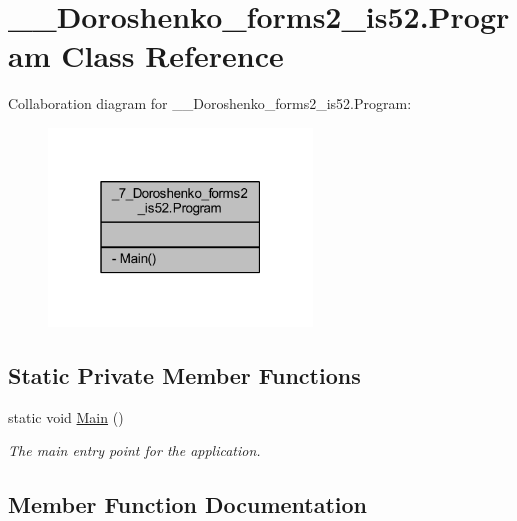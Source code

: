 \hypertarget{class__7___doroshenko__forms2__is52_1_1_program}{}\section{\+\_\+\_\+\+Doroshenko\+\_\+forms2\+\_\+is52.\+Program Class Reference}
\label{class__7___doroshenko__forms2__is52_1_1_program}


Collaboration diagram for \+\_\+\_\+\+Doroshenko\+\_\+forms2\+\_\+is52.\+Program\+:
\nopagebreak
\begin{figure}[H]
\begin{center}
\leavevmode
\includegraphics[width=199pt]{class__7___doroshenko__forms2__is52_1_1_program__coll__graph}
\end{center}
\end{figure}
\subsection*{Static Private Member Functions}
\begin{DoxyCompactItemize}
\item 
static void \hyperlink{class__7___doroshenko__forms2__is52_1_1_program_ace08cf1fcbdb3378df817886ef46f8c3}{Main} ()
\begin{DoxyCompactList}\small\item\em The main entry point for the application. \end{DoxyCompactList}\end{DoxyCompactItemize}


\subsection{Member Function Documentation}
\hypertarget{class__7___doroshenko__forms2__is52_1_1_program_ace08cf1fcbdb3378df817886ef46f8c3}{}\label{class__7___doroshenko__forms2__is52_1_1_program_ace08cf1fcbdb3378df817886ef46f8c3} 
